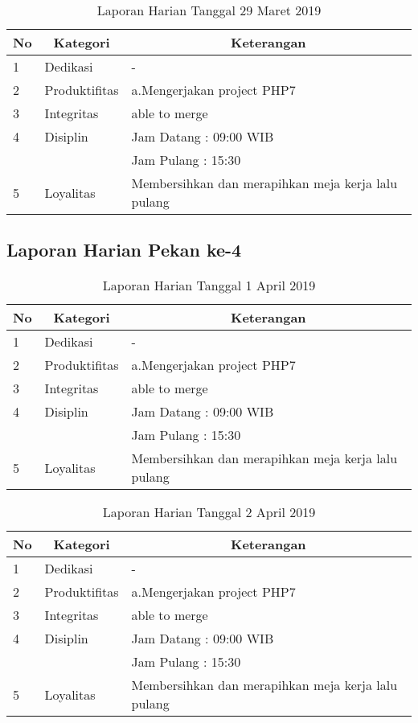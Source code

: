 \begin{table}[htp]
\caption{Laporan Harian Tanggal 29 Maret 2019}
\label{tab:lh290319}
\begin{tabular}{|l|l|l|}
\hline
\textbf{No} & \multicolumn{1}{c|}{\textbf{Kategori}} & \multicolumn{1}{c|}{\textbf{Keterangan}} \\ \hline
1 & Dedikasi & - \\ \hline
2 & Produktifitas & a.Mengerjakan project PHP7 \\
3 & Integritas & able to merge \\ \hline
4 & Disiplin & Jam Datang : 09:00 WIB \\
   &  & Jam Pulang : 15:30 \\ \hline
5 & Loyalitas & Membersihkan dan merapihkan meja kerja lalu pulang \\ \hline
\end{tabular}
\end{table}

\subsection{Laporan Harian Pekan ke-4}

\begin{table}[htp]
\caption{Laporan Harian Tanggal 1 April 2019}
\label{tab:lh010419}
\begin{tabular}{|l|l|l|}
\hline
\textbf{No} & \multicolumn{1}{c|}{\textbf{Kategori}} & \multicolumn{1}{c|}{\textbf{Keterangan}} \\ \hline
1 & Dedikasi & - \\ \hline
2 & Produktifitas & a.Mengerjakan project PHP7 \\
3 & Integritas & able to merge \\ \hline
4 & Disiplin & Jam Datang : 09:00 WIB \\
   &  & Jam Pulang : 15:30 \\ \hline
5 & Loyalitas & Membersihkan dan merapihkan meja kerja lalu pulang \\ \hline
\end{tabular}
\end{table}

\begin{table}[htp]
\caption{Laporan Harian Tanggal 2  April 2019}
\label{tab:lh020419}
\begin{tabular}{|l|l|l|}
\hline
\textbf{No} & \multicolumn{1}{c|}{\textbf{Kategori}} & \multicolumn{1}{c|}{\textbf{Keterangan}} \\ \hline
1 & Dedikasi & - \\ \hline
2 & Produktifitas & a.Mengerjakan project PHP7 \\
3 & Integritas & able to merge \\ \hline
4 & Disiplin & Jam Datang : 09:00 WIB \\
   &  & Jam Pulang : 15:30 \\ \hline
5 & Loyalitas & Membersihkan dan merapihkan meja kerja lalu pulang \\ \hline
\end{tabular}
\end{table}

